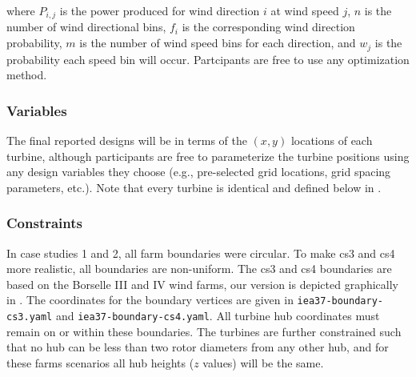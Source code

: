 \documentclass[10pt]{article}
\begin{document}
        \noindent where $P_{i,j}$ is the power produced for wind direction $i$ at wind speed $j$, $n$ is the number of wind directional bins, $f_i$ is the corresponding wind direction probability, $m$ is the number of wind speed bins for each direction, and $w_j$ is the probability each speed bin will occur.  Partcipants are free to use any optimization method.

    \subsubsection*{Variables}
    \label{sec:IndependentVariables}
        The final reported designs will be in terms of the $(x, y)$ locations of each turbine, although participants are free to parameterize the turbine positions using any design variables they choose (e.g., pre-selected grid locations, grid spacing parameters, etc.).  
        Note that every turbine is identical and defined below in .

    \subsubsection*{Constraints}
    \label{sec:Constraints}
        In case studies 1 and 2, all farm boundaries were circular.
        To make cs3 and cs4 more realistic, all boundaries are non-uniform.
        The cs3 and cs4 boundaries are based on the Borselle III and IV wind farms, our version is depicted graphically in .
        The coordinates for the boundary vertices are given in \texttt{iea37-boundary-cs3.yaml} and \texttt{iea37-boundary-cs4.yaml}.
        All turbine hub coordinates must remain on or within these boundaries.
        The turbines are further constrained such that no hub can be less than two rotor diameters from any other hub, and for these farms scenarios all hub heights ($z$ values) will be the same.
        
\end{document}
